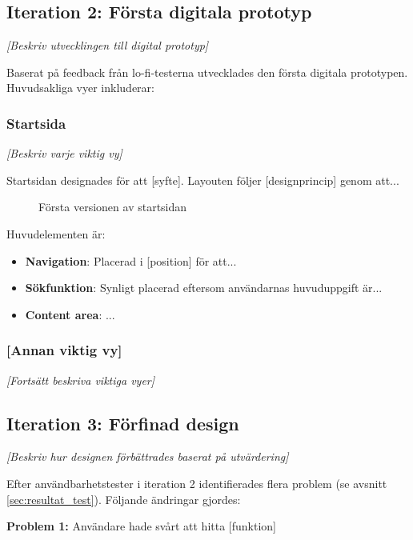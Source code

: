 \subsection{Iteration 2: Första digitala prototyp}

\textit{[Beskriv utvecklingen till digital prototyp]}

Baserat på feedback från lo-fi-testerna utvecklades den första digitala prototypen. Huvudsakliga vyer inkluderar:

\subsubsection{Startsida}

\textit{[Beskriv varje viktig vy]}

Startsidan designades för att [syfte]. Layouten följer [designprincip] genom att...

\begin{figure}[h]
    \centering
    \caption{Första versionen av startsidan}
    \label{fig:startsida_v1}
\end{figure}

Huvudelementen är:
\begin{itemize}
    \item \textbf{Navigation}: Placerad i [position] för att...
    \item \textbf{Sökfunktion}: Synligt placerad eftersom användarnas huvuduppgift är...
    \item \textbf{Content area}: ...
\end{itemize}


\subsubsection{[Annan viktig vy]}

\textit{[Fortsätt beskriva viktiga vyer]}


\subsection{Iteration 3: Förfinad design}

\textit{[Beskriv hur designen förbättrades baserat på utvärdering]}

Efter användbarhetstester i iteration 2 identifierades flera problem (se avsnitt \ref{sec:resultat_test}). Följande ändringar gjordes:

\textbf{Problem 1:} Användare hade svårt att hitta [funktion]

